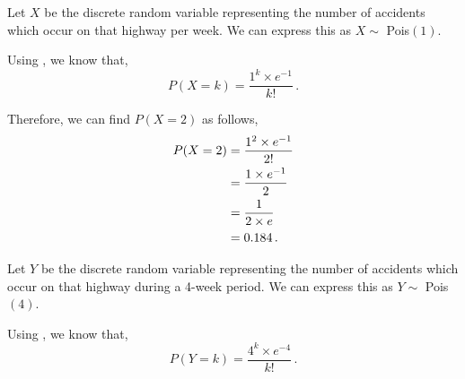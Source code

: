%
%

\begin{subquestions}
	

\subquestion

Let $X$ be the discrete random variable representing the number of accidents which occur on that highway per week. We can express this as $X \sim $ Pois$(1)$.

\begin{subsubquestions}
	
\subsubquestion

Using , we know that,
\begin{equation}
	P(X=k)= \frac{1^k \times e^{-1}}{k!} \,.
\end{equation}
	
Therefore, we can find $P(X=2)$ as follows,
\begin{align}
	P(X=2) & = \frac{1^2 \times e^{-1}}{2!} \nonumber \\
	       & = \frac{1 \times e^{-1}}{2} \nonumber \\
	       & = \frac{1}{2 \times e} \nonumber \\
	       & = 0.184 \,.
\end{align}
	

\subsubquestion

Let $Y$ be the discrete random variable representing the number of accidents which occur on that highway during a 4-week period. We can express this as $Y \sim $ Pois$(4)$.

Using , we know that,
\begin{equation}
	P(Y=k)= \frac{4^k \times e^{-4}}{k!} \,. \label{2013:q4:eq:Pois1}
\end{equation}


\end{subsubquestions}
\end{subquestions}
